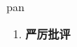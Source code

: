 
\begin{frame}
{\huge pan}
\begin{center}
\begin{enumerate}\Large
  \item \textbf{严厉批评}
\end{enumerate}
\end{center}
\end{frame}
